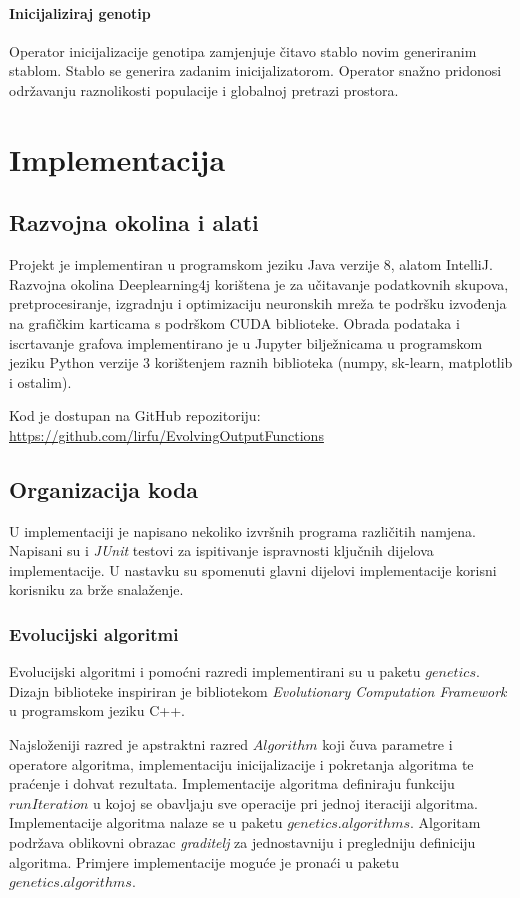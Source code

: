 \documentclass[times, utf8, numeric, diplomski]{fer}
\begin{document}
\subsubsection{Inicijaliziraj genotip}
Operator inicijalizacije genotipa zamjenjuje čitavo stablo novim generiranim stablom. Stablo se generira zadanim inicijalizatorom. Operator snažno pridonosi održavanju raznolikosti populacije i globalnoj pretrazi prostora.


\chapter{Implementacija}
\section{Razvojna okolina i alati}
Projekt je implementiran u programskom jeziku Java verzije 8, alatom IntelliJ. Razvojna okolina Deeplearning4j korištena je za učitavanje podatkovnih skupova, pretprocesiranje, izgradnju i optimizaciju neuronskih mreža te podršku izvođenja na grafičkim karticama s podrškom CUDA biblioteke. Obrada podataka i iscrtavanje grafova implementirano je u Jupyter bilježnicama u programskom jeziku Python verzije 3 korištenjem raznih biblioteka (numpy, sk-learn, matplotlib i ostalim).

\noindent
Kod je dostupan na GitHub repozitoriju: \\
\url{https://github.com/lirfu/EvolvingOutputFunctions}

\section{Organizacija koda}
U implementaciji je napisano nekoliko izvršnih programa različitih namjena. Napisani su i \textit{JUnit} testovi za ispitivanje ispravnosti ključnih dijelova implementacije. U nastavku su spomenuti glavni dijelovi implementacije korisni korisniku za brže snalaženje.

\subsection{Evolucijski algoritmi}
Evolucijski algoritmi i pomoćni razredi implementirani su u paketu $genetics$. Dizajn biblioteke inspiriran je bibliotekom \textit{Evolutionary Computation Framework} \citep{ecf} u programskom jeziku C++. 

Najsloženiji razred je apstraktni razred $Algorithm$ koji čuva parametre i operatore algoritma, implementaciju inicijalizacije i pokretanja algoritma te praćenje i dohvat rezultata. Implementacije algoritma definiraju funkciju $runIteration$ u kojoj se obavljaju sve operacije pri jednoj iteraciji algoritma. Implementacije algoritma nalaze se u paketu $genetics.algorithms$. Algoritam podržava oblikovni obrazac \textit{graditelj} za jednostavniju i pregledniju definiciju algoritma. Primjere implementacije moguće je pronaći u paketu $genetics.algorithms$.
\end{document}
